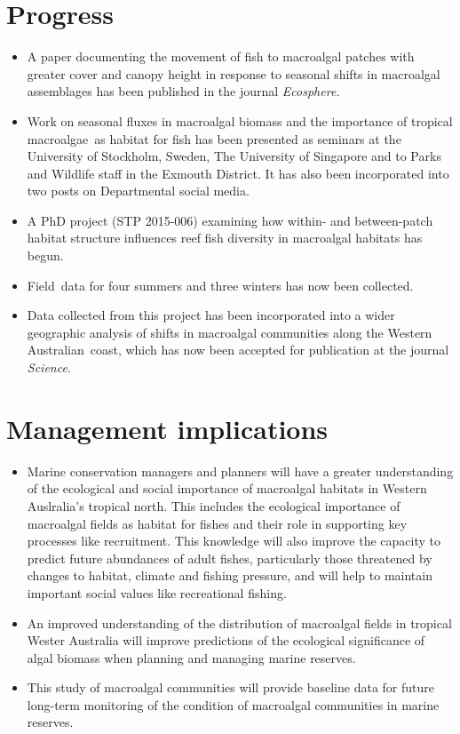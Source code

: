 \documentclass[version=last,
    paper=a4, %
    10pt, %
    usenames,
    dvipsnames,
    oneside, %
    headings=openany, %
    DIV=15 %
]{scrbook}
\begin{document}
\section*{Progress}
\begin{itemize}
\itemsep1pt\parskip0pt
\item
  A paper documenting the movement of fish to macroalgal patches with
  greater cover and canopy height in response to seasonal shifts in
  macroalgal assemblages has been published in the journal
  \emph{Ecosphere.\\}
\item
  Work on seasonal fluxes in macroalgal biomass and the importance of
  tropical macroalgae~as habitat for fish has been presented as seminars
  at the University of Stockholm, Sweden, The University of Singapore
  and to Parks and Wildlife staff in the Exmouth District. It has also
  been incorporated into two posts on Departmental social media.
\item
  A PhD project (STP 2015-006) examining how within- and between-patch
  habitat structure influences reef fish diversity in macroalgal
  habitats has begun.
\item
  Field~data for four summers and three winters has now been collected.
\item
  Data collected from this project has been incorporated into a wider
  geographic analysis of shifts in macroalgal communities along the
  Western Australian~coast, which has now been accepted for publication
  at the journal \emph{Science}.
\end{itemize}



\section*{Management implications}
\begin{itemize}
\itemsep1pt\parskip0pt
\item
  Marine conservation managers and planners will have a greater
  understanding of the ecological and social importance of macroalgal
  habitats in Western Auslralia's tropical north. This includes the
  ecological importance of macroalgal fields as habitat for fishes and
  their role in supporting key processes like recruitment. This
  knowledge will also improve the capacity to predict future abundances
  of adult fishes, particularly those threatened by changes to habitat,
  climate and fishing pressure, and will help to maintain important
  social values like recreational fishing.
\item
  An improved understanding of the distribution of macroalgal fields in
  tropical Wester Australia will improve predictions of the ecological
  significance of algal biomass when planning and managing marine
  reserves.
\item
  This study of macroalgal communities will provide baseline data for
  future long-term monitoring of the condition of macroalgal communities
  in marine reserves.
\end{itemize}
\end{document}
